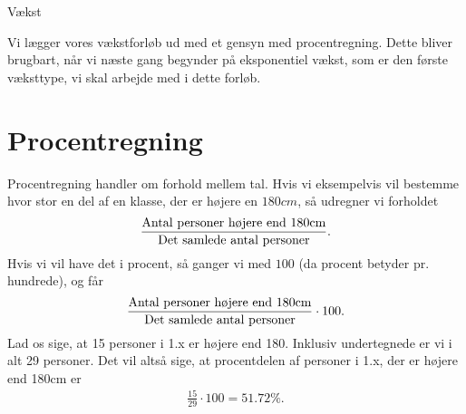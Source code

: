 \begin{center}
\Huge
Vækst
\end{center}
Vi lægger vores vækstforløb ud med et gensyn med procentregning. Dette bliver brugbart, når vi næste gang begynder på eksponentiel vækst, som er den første væksttype, vi skal arbejde med i dette forløb. 
\section*{Procentregning}

Procentregning handler om forhold mellem tal. Hvis vi eksempelvis vil bestemme hvor stor en del af en klasse, der er højere en $180cm$, så udregner vi forholdet 
\begin{align*}
	\frac{\textnormal{Antal personer højere end 180cm}}{\textnormal{Det samlede antal personer}}.
\end{align*}
 Hvis vi vil have det i procent, så ganger vi med $100$ (da procent betyder pr. hundrede), og får
\begin{align*}
	\frac{\textnormal{Antal personer højere end 180cm}}{\textnormal{Det samlede antal personer}}\cdot 100.
\end{align*}
Lad os sige, at 15 personer i 1.x er højere end 180. Inklusiv undertegnede er vi i alt 29 personer. Det vil altså sige, at procentdelen af personer i 1.x, der er højere end 180cm er 
\begin{align*}
\frac{15}{29}\cdot 100 = 51.72\%.
\end{align*}
